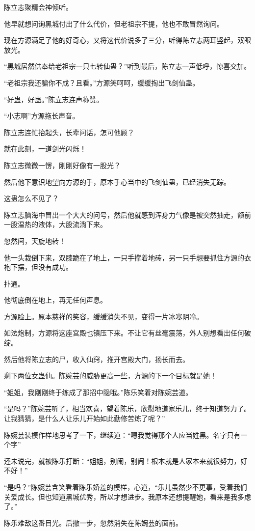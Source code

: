 \begin{this_body}
陈立志聚精会神倾听。

他早就想问询黑城付出了什么代价，但老祖宗不提，他也不敢冒然询问。

现在方源满足了他的好奇心，又将这代价说多了三分，听得陈立志两耳竖起，双眼放光。

“黑城居然供奉给老祖宗一只七转仙蛊？”听到最后，陈立志一声低呼，惊喜交加。

“老祖宗我还骗你不成？且看。”方源笑呵呵，缓缓掏出飞剑仙蛊。

“好蛊，好蛊。”陈立志连声称赞。

“小志啊”方源拖长声音。

陈立志连忙抬起头，长辈问话，怎可他顾？

就在此刻，一道剑光闪烁！

陈立志微微一愣，刚刚好像有一股光？

然后他下意识地望向方源的手，原本手心当中的飞剑仙蛊，已经消失无踪。

这蛊怎么不见了？

陈立志脑海中冒出一个大大的问号，然后他就感到浑身力气像是被突然抽走，额前一股温热的液体，大股流淌下来。

忽然间，天旋地转！

他一头栽倒下来，双膝跪在了地上，一只手撑着地砖，另一只手想要抓住方源的衣袍下摆，但没有成功。

扑通。

他彻底倒在地上，再无任何声息。

方源脸上。原本慈祥的笑容，缓缓消失不见，变得一片冰寒阴冷。

如法炮制，方源将这座宫殿也镇压下来。不让它有丝毫震荡，外人别想看出任何破绽。

然后他将陈立志的尸，收入仙窍，推开宫殿大门，扬长而去。

剩下两位女蛊仙。陈婉芸的威胁更高一些，方源的下一个目标就是她！

“姐姐，我刚刚终于练成了那招中隐哦。”陈乐笑着对陈婉芸道。

“是吗？”陈婉芸听了，相当欢喜，望着陈乐，欣慰地道家乐儿，终于知道努力了。让我猜猜，是什么人让乐儿开始如此勤修苦炼了呢？”

陈婉芸装模作样地思考了一下，继续道：“嗯我觉得那个人应当姓黑。名字只有一个字”

还未说完，就被陈乐打断：“姐姐，别闹，别闹！根本就是人家本来就很努力，好不好！”

“是吗？”陈婉芸含笑看着陈乐娇羞的模样，心道，“乐儿虽然少不更事，受着我们关爱成长。但也知道黑城优秀，所以才想进步。我原本还想提醒她，看来是我多虑了。”

陈乐难敌这番目光。后撤一步，忽然消失在陈婉芸的面前。


\end{this_body}
